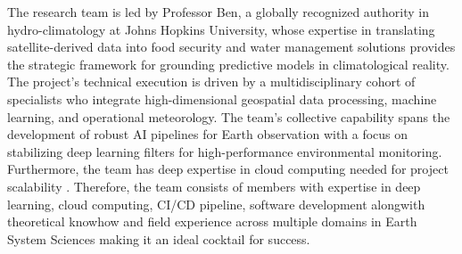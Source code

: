\documentclass[11pt,letterpaper]{article}
\theoremstyle{plain}
\theoremstyle{definition}
\theoremstyle{remark}
\begin{document}


The research team is led by Professor Ben, a globally recognized authority in hydro-climatology at Johns Hopkins University, whose expertise in translating satellite-derived data into food security and water management solutions provides the strategic framework for grounding predictive models in climatological reality. The project's technical execution is driven by a multidisciplinary cohort of specialists who integrate high-dimensional geospatial data processing, machine learning, and operational meteorology. The team’s collective capability spans the development of robust AI pipelines for Earth observation with a focus on stabilizing deep learning filters for high-performance environmental monitoring. Furthermore, the team has deep expertise in cloud computing needed for project scalability . Therefore, the team consists of members with expertise in deep learning, cloud computing, CI/CD pipeline, software development alongwith theoretical knowhow  and field experience across multiple domains in Earth System Sciences making it an ideal cocktail for success.
\end{document}
